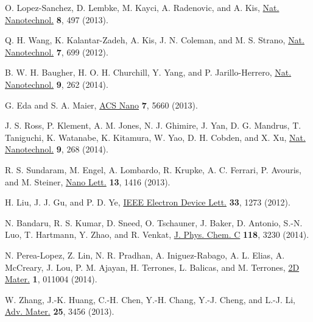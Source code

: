 \documentclass[%
 reprint,%
 amssymb, amsmath,%
 aip,cha,%
]{revtex4-1}
\begin{document}
\begin{thebibliography}{9}
O. Lopez-Sanchez, D. Lembke, M. Kayci, A. Radenovic, and A. Kis,
\href{https://www.nature.com/nnano/journal/v8/n7/full/nnano.2013.100.html}{Nat. Nanotechnol.} \textbf{8}, 497 (2013).

Q. H. Wang, K. Kalantar-Zadeh, A. Kis, J. N. Coleman, and M. S. Strano,
\href{https://www.nature.com/nnano/journal/v7/n11/full/nnano.2012.193.html}{Nat. Nanotechnol.} \textbf{7}, 699 (2012).

B. W. H. Baugher, H. O. H. Churchill, Y. Yang, and P. Jarillo-Herrero,
\href{https://www.nature.com/nnano/journal/v9/n4/full/nnano.2014.25.html}{Nat. Nanotechnol.} \textbf{9}, 262 (2014).

G. Eda and S. A. Maier,
\href{http://pubs.acs.org/doi/abs/10.1021/nn403159y}{ACS Nano} \textbf{7}, 5660 (2013).

J. S. Ross, P. Klement, A. M. Jones, N. J. Ghimire, J. Yan, D. G. Mandrus, T. Taniguchi, K. Watanabe, K. Kitamura, W. Yao, D. H. Cobden, and X. Xu,
\href{https://www.nature.com/nnano/journal/v9/n4/full/nnano.2014.26.html}{Nat. Nanotechnol.} \textbf{9}, 268 (2014).

R. S. Sundaram, M. Engel, A. Lombardo, R. Krupke, A. C. Ferrari, P. Avouris, and M. Steiner,
\href{http://pubs.acs.org/doi/abs/10.1021/nl400516a}{Nano Lett.} \textbf{13}, 1416 (2013).

H. Liu, J. J. Gu, and P. D. Ye,
\href{http://ieeexplore.ieee.org/document/6239561/}{IEEE Electron Device Lett.} \textbf{33}, 1273 (2012).

N. Bandaru, R. S. Kumar, D. Sneed, O. Tschauner, J. Baker, D. Antonio, S.-N. Luo, T. Hartmann, Y. Zhao, and R. Venkat,
\href{http://pubs.acs.org/doi/abs/10.1021/jp410167k}{J. Phys. Chem. C} \textbf{118}, 3230 (2014).

N. Perea-Lopez, Z. Lin, N. R. Pradhan, A. Iniguez-Rabago, A. L. Elias, A. McCreary, J. Lou, P. M. Ajayan, H. Terrones, L. Balicas, and M. Terrones,
\href{http://iopscience.iop.org/article/10.1088/2053-1583/1/1/011004/meta;jsessionid=FF65509422827B3EC697B9F145C5D7F4.c2.iopscience.cld.iop.org}{2D Mater.} \textbf{1}, 011004 (2014).

W. Zhang, J.-K. Huang, C.-H. Chen, Y.-H. Chang, Y.-J. Cheng, and L.-J. Li,
\href{http://onlinelibrary.wiley.com/doi/10.1002/adma.201301244/abstract;jsessionid=7CCC83447D023B110046D0BD65F10C98.f03t01}{Adv. Mater.} \textbf{25}, 3456 (2013).


\end{thebibliography}
\end{document}
